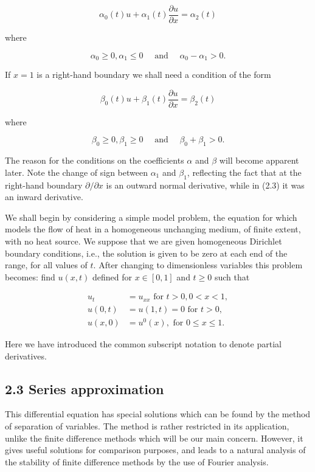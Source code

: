 \documentclass[10pt]{article}
\begin{document}
\[
\alpha_{0}(t) u+\alpha_{1}(t) \frac{\partial u}{\partial x}=\alpha_{2}(t)
\]

where

\[
\alpha_{0} \geq 0, \alpha_{1} \leq 0 \quad \text { and } \quad \alpha_{0}-\alpha_{1}>0 .
\]

If \(x=1\) is a right-hand boundary we shall need a condition of the form

\[
\beta_{0}(t) u+\beta_{1}(t) \frac{\partial u}{\partial x}=\beta_{2}(t)
\]

where

\[
\beta_{0} \geq 0, \beta_{1} \geq 0 \quad \text { and } \quad \beta_{0}+\beta_{1}>0 .
\]

The reason for the conditions on the coefficients \(\alpha\) and \(\beta\) will become apparent later. Note the change of sign between \(\alpha_{1}\) and \(\beta_{1}\), reflecting the fact that at the right-hand boundary \(\partial / \partial x\) is an outward normal derivative, while in (2.3) it was an inward derivative.

We shall begin by considering a simple model problem, the equation for which models the flow of heat in a homogeneous unchanging medium, of finite extent, with no heat source. We suppose that we are given homogeneous Dirichlet boundary conditions, i.e., the solution is given to be zero at each end of the range, for all values of \(t\). After changing to dimensionless variables this problem becomes: find \(u(x, t)\) defined for \(x \in[0,1]\) and \(t \geq 0\) such that

\[
\begin{aligned}
u_{t} & =u_{x x} \text { for } t>0,0<x<1, \\
u(0, t) & =u(1, t)=0 \text { for } t>0, \\
u(x, 0) & =u^{0}(x), \text { for } 0 \leq x \leq 1 .
\end{aligned}
\]

Here we have introduced the common subscript notation to denote partial derivatives.

\subsection*{2.3 Series approximation}
This differential equation has special solutions which can be found by the method of separation of variables. The method is rather restricted in its application, unlike the finite difference methods which will be our main concern. However, it gives useful solutions for comparison purposes, and leads to a natural analysis of the stability of finite difference methods by the use of Fourier analysis.
\end{document}
